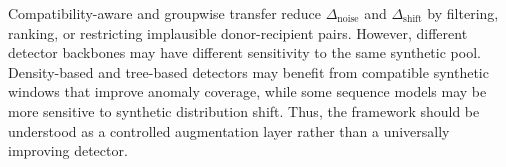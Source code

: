 \documentclass[conference]{IEEEtran}
\begin{document}
Compatibility-aware and groupwise transfer reduce $\Delta_{\mathrm{noise}}$ and $\Delta_{\mathrm{shift}}$ by filtering, ranking, or restricting implausible donor-recipient pairs. However, different detector backbones may have different sensitivity to the same synthetic pool. Density-based and tree-based detectors may benefit from compatible synthetic windows that improve anomaly coverage, while some sequence models may be more sensitive to synthetic distribution shift. Thus, the framework should be understood as a controlled augmentation layer rather than a universally improving detector.

\end{document}
